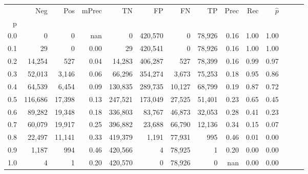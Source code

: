 \begin{tabular}{rrrrrrrrrrrrrr}
\toprule
{} &      Neg &     Pos & mPrec &       TN &       FP &      FN &      TP &  Prec &   Rec & $\hat{p}$ \\
p   &          &         &       &          &          &         &         &       &       &           \\
\midrule
0.0 &        0 &       0 &   nan &        0 &  420,570 &       0 &  78,926 &  0.16 &  1.00 &      1.00 \\
0.1 &       29 &       0 &  0.00 &       29 &  420,541 &       0 &  78,926 &  0.16 &  1.00 &      1.00 \\
0.2 &   14,254 &     527 &  0.04 &   14,283 &  406,287 &     527 &  78,399 &  0.16 &  0.99 &      0.97 \\
0.3 &   52,013 &   3,146 &  0.06 &   66,296 &  354,274 &   3,673 &  75,253 &  0.18 &  0.95 &      0.86 \\
0.4 &   64,539 &   6,454 &  0.09 &  130,835 &  289,735 &  10,127 &  68,799 &  0.19 &  0.87 &      0.72 \\
0.5 &  116,686 &  17,398 &  0.13 &  247,521 &  173,049 &  27,525 &  51,401 &  0.23 &  0.65 &      0.45 \\
0.6 &   89,282 &  19,348 &  0.18 &  336,803 &   83,767 &  46,873 &  32,053 &  0.28 &  0.41 &      0.23 \\
0.7 &   60,079 &  19,917 &  0.25 &  396,882 &   23,688 &  66,790 &  12,136 &  0.34 &  0.15 &      0.07 \\
0.8 &   22,497 &  11,141 &  0.33 &  419,379 &    1,191 &  77,931 &     995 &  0.46 &  0.01 &      0.00 \\
0.9 &    1,187 &     994 &  0.46 &  420,566 &        4 &  78,925 &       1 &  0.20 &  0.00 &      0.00 \\
1.0 &        4 &       1 &  0.20 &  420,570 &        0 &  78,926 &       0 &   nan &  0.00 &      0.00 \\
\bottomrule
\end{tabular}
